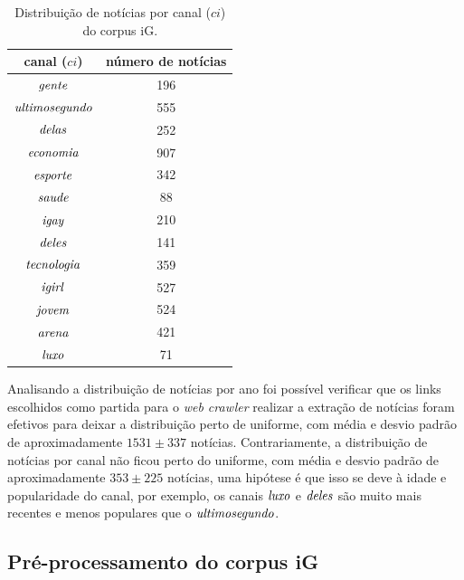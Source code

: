 \documentclass[
    12pt,                %
    oneside,            %
    a4paper,            %
    english,            %
    brazil                %
    ]{abntex2ppgsi}
\begin{document}
\begin{table}[h]
\label{tab:distcanais}
\centering
\caption{Distribuição de notícias por canal ($ci$) do corpus iG.}
\begin{tabular}{c|c}
\hline
canal ($ci$)                    & número de notícias \\
\hline
$\text{\textit{gente}}$         & 196 \\
$\text{\textit{ultimosegundo}}$ & 555 \\
$\text{\textit{delas}}$         & 252 \\
$\text{\textit{economia}}$      & 907 \\
$\text{\textit{esporte}}$       & 342 \\
$\text{\textit{saude}}$         & 88  \\
$\text{\textit{igay}}$          & 210 \\
$\text{\textit{deles}}$         & 141 \\
$\text{\textit{tecnologia}}$    & 359 \\
$\text{\textit{igirl}}$         & 527 \\
$\text{\textit{jovem}}$         & 524 \\
$\text{\textit{arena}}$         & 421 \\
$\text{\textit{luxo}}$          & 71  \\
\hline
\end{tabular}
\end{table}

Analisando a distribuição de notícias por ano foi possível verificar que os links escolhidos como partida para o \textit{web crawler} realizar a extração de notícias foram efetivos para deixar a distribuição perto de uniforme, com média e desvio padrão de aproximadamente $1531 \pm 337$ notícias.
Contrariamente, a distribuição de notícias por canal não ficou perto do uniforme, com média e desvio padrão de aproximadamente $353 \pm 225$ notícias, uma hipótese é que isso se deve à idade e popularidade do canal, por exemplo, os canais $\text{\textit{luxo}}$ e $\text{\textit{deles}}$ são muito mais recentes e menos populares que o $\text{\textit{ultimosegundo}}$.

\subsection{Pré-processamento do corpus iG}
\end{document}
